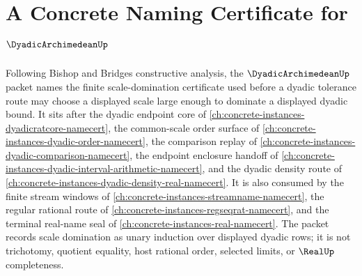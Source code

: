 \chapter{A Concrete Naming Certificate for $\DyadicArchimedeanUp$}
\label{ch:concrete-instances-dyadic-archimedean-namecert}

Following Bishop and Bridges constructive analysis, the $\DyadicArchimedeanUp$ packet names the finite scale-domination certificate used before a dyadic tolerance route may choose a displayed scale large enough to dominate a displayed dyadic bound. It sits after the dyadic endpoint core of \autoref{ch:concrete-instances-dyadicratcore-namecert}, the common-scale order surface of \autoref{ch:concrete-instances-dyadic-order-namecert}, the comparison replay of \autoref{ch:concrete-instances-dyadic-comparison-namecert}, the endpoint enclosure handoff of \autoref{ch:concrete-instances-dyadic-interval-arithmetic-namecert}, and the dyadic density route of \autoref{ch:concrete-instances-dyadic-density-real-namecert}. It is also consumed by the finite stream windows of \autoref{ch:concrete-instances-streamname-namecert}, the regular rational route of \autoref{ch:concrete-instances-regseqrat-namecert}, and the terminal real-name seal of \autoref{ch:concrete-instances-real-namecert}. The packet records scale domination as unary induction over displayed dyadic rows; it is not trichotomy, quotient equality, host rational order, selected limits, or $\RealUp$ completeness.

